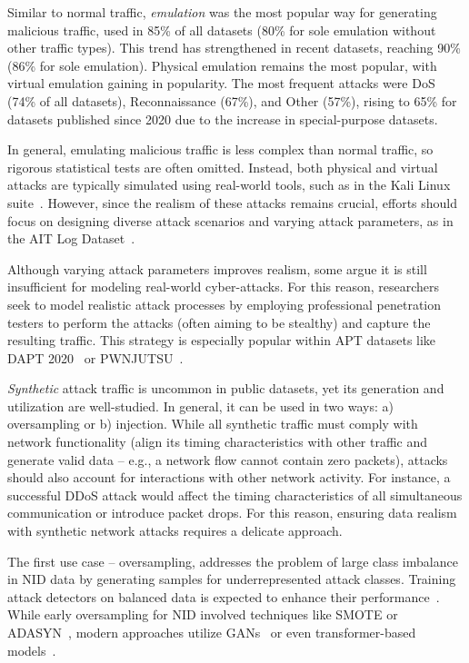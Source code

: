 Similar to normal traffic, \emph{emulation} was the most popular way for generating malicious traffic, used in 85\% of all datasets (80\% for sole emulation without other traffic types). This trend has strengthened in recent datasets, reaching 90\% (86\% for sole emulation). Physical emulation remains the most popular, with virtual emulation gaining in popularity. The most frequent attacks were DoS (74\% of all datasets), Reconnaissance (67\%), and Other (57\%), rising to 65\% for datasets published since 2020 due to the increase in special-purpose datasets.

In general, emulating malicious traffic is less complex than normal traffic, so rigorous statistical tests are often omitted. Instead, both physical and virtual attacks are typically simulated using real-world tools, such as in the Kali Linux suite~\cite{kali_linux}. However, since the realism of these attacks remains crucial, efforts should focus on designing diverse attack scenarios and varying attack parameters, as in the AIT Log Dataset~\cite{landauer2023_ait_ldsv2_dataset}.

Although varying attack parameters improves realism, some argue it is still insufficient for modeling real-world cyber-attacks. For this reason, researchers seek to model realistic attack processes by employing professional penetration testers to perform the attacks (often aiming to be stealthy) and capture the resulting traffic. This strategy is especially popular within APT datasets like DAPT 2020~\cite{myneni2020_dapt2020} or PWNJUTSU~\cite{berady2022_pwnjutsu_dataset}.

\emph{Synthetic} attack traffic is uncommon in public datasets, yet its generation and utilization are well-studied. In general, it can be used in two ways: a) oversampling or b) injection. While all synthetic traffic must comply with network functionality (align its timing characteristics with other traffic and generate valid data -- e.g., a network flow cannot contain zero packets), attacks should also account for interactions with other network activity. For instance, a successful DDoS attack would affect the timing characteristics of all simultaneous communication or introduce packet drops. For this reason, ensuring data realism with synthetic network attacks requires a delicate approach.

The first use case -- oversampling, addresses the problem of large class imbalance in NID data by generating samples for underrepresented attack classes. Training attack detectors on balanced data is expected to enhance their performance~\cite{liu2021_id_imbalanced_network_traffic_ml_dl}. While early oversampling for NID involved techniques like SMOTE or ADASYN~\cite{cieslak2006_combating_nid_imbalance,hu2020_wireless_nids_adasyn_cnn,bagui2021_resampling_imbalanced_nids}, modern approaches utilize GANs~\cite{kumar2023_synthetic_attack_model_gans} or even transformer-based models~\cite{wolf2024_benchmarking_synthetic_network_data}.

